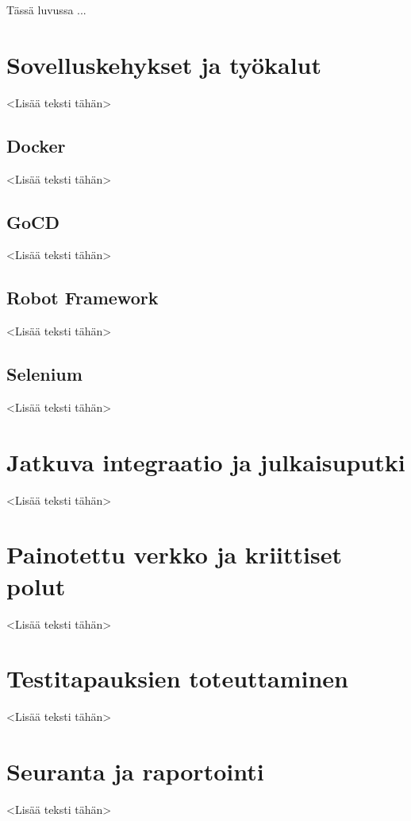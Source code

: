 Tässä luvussa ...

\section{Sovelluskehykset ja työkalut}

<Lisää teksti tähän>

\subsection{Docker}

<Lisää teksti tähän>

\subsection{GoCD}

<Lisää teksti tähän>

\subsection{Robot Framework}

<Lisää teksti tähän>

\subsection{Selenium}

<Lisää teksti tähän>

\section{Jatkuva integraatio ja julkaisuputki}

<Lisää teksti tähän>

\section{Painotettu verkko ja kriittiset polut}

<Lisää teksti tähän>

\section{Testitapauksien toteuttaminen}

<Lisää teksti tähän>

\section{Seuranta ja raportointi}

<Lisää teksti tähän>
